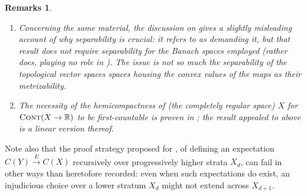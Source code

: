 \documentclass[11pt,leqno]{article}
\theoremstyle{plain}
\theoremstyle{plain}
\theoremstyle{plain}
\newtheorem{remarks}[lemma]{Remarks}
\numberwithin{equation}{section}
\theoremstyle{nonumberplain}
\newcommand\bR{{\mathbb R}}
\newcommand\1{{\bf 1}}
\newcommand{\cat}[1]{\textsc{#1}}
\begin{document}
\begin{remarks}
\begin{enumerate}[(1),wide]
  \item Concerning the same material, the discussion on \cite[p.155, post Remarque]{blnch} gives a slightly misleading account of why separability is crucial: it refers to \cite[Theorem 3.2'']{mich_contsel-1} as demanding it, but that result does not require separability for the Banach spaces employed (rather \cite[Theorem 3.1'']{mich_contsel-1} does, playing no role in \cite{blnch}). The issue is not so much the separability of the topological vector spaces spaces housing the convex values of the maps as their metrizability.
    
  \item The necessity of the hemicompactness of (the completely regular space) $X$ for $\cat{Cont}(X\to \bR)$ to be first-countable is proven in \cite[Theorem 8]{ar_top}; the result \cite[\S 39.4(6)]{k_tvs-2} appealed to above is a linear version thereof. 
  \end{enumerate}
\end{remarks}

Note also that the proof strategy proposed for \cite[Theorem 4.3]{pt_brnch}, of defining an expectation $C(Y)\xrightarrow{E}C(X)$ recursively over progressively higher strata $X_d$, can fail in other ways than heretofore recorded: even when such expectations do exist, an injudicious choice over a lower stratum $X_d$ might not extend across $X_{d+1}$. 
\end{document}
